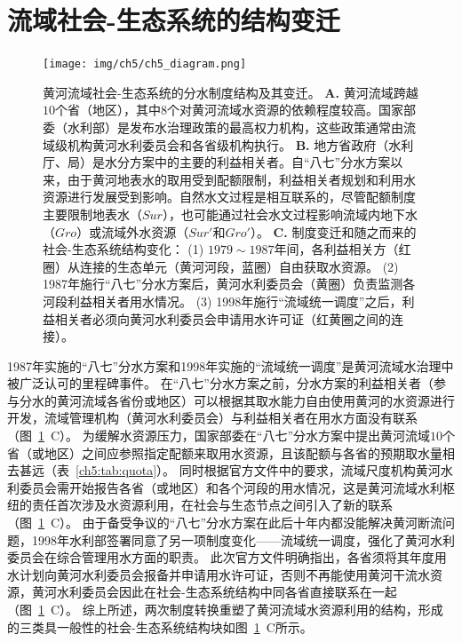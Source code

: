 
\section{流域社会-生态系统的结构变迁}\label{results-1}

\begin{figure}[!t]
	\texttt{[image: img/ch5/ch5\_diagram.png]}
	\caption[黄河流域社会-生态系统的分水制度结构及其变迁]{
		黄河流域社会-生态系统的分水制度结构及其变迁。
		\textbf{A.} 黄河流域跨越$10$个省（地区），其中$8$个对黄河流域水资源的依赖程度较高。国家部委（水利部）是发布水治理政策的最高权力机构，这些政策通常由流域级机构黄河水利委员会和各省级机构执行。
		\textbf{B.} 地方省政府（水利厅、局）是水分方案中的主要的利益相关者。自“八七”分水方案以来，由于黄河地表水的取用受到配额限制，利益相关者规划和利用水资源进行发展受到影响。自然水文过程是相互联系的，尽管配额制度主要限制地表水（$Sur$），也可能通过社会水文过程影响流域内地下水（$Gro$）或流域外水资源（$Sur'$和$Gro'$）。
		\textbf{C.} 制度变迁和随之而来的社会-生态系统结构变化：
		(1) $1979 \sim 1987$年间，各利益相关方（红圈）从连接的生态单元（黄河河段，蓝圈）自由获取水资源。
		(2) 1987年施行“八七”分水方案后，黄河水利委员会（黄圈）负责监测各河段利益相关者用水情况。
		(3) 1998年施行“流域统一调度”之后，利益相关者必须向黄河水利委员会申请用水许可证（红黄圈之间的连接）。}\label{fig:structure}
\end{figure}

1987年实施的“八七”分水方案和1998年实施的“流域统一调度”是黄河流域水治理中被广泛认可的里程碑事件。
在“八七”分水方案之前，分水方案的利益相关者（参与分水的黄河流域各省份或地区）可以根据其取水能力自由使用黄河的水资源进行开发，流域管理机构（黄河水利委员会）与利益相关者在用水方面没有联系（图~\ref{fig:structure}~C）。
为缓解水资源压力，国家部委在“八七”分水方案中提出黄河流域$10$个省（或地区）之间应参照指定配额来取用水资源，且该配额与各省的预期取水量相去甚远（表~\ref{ch5:tab:quota}）。
同时根据官方文件中的要求，流域尺度机构黄河水利委员会需开始报告各省（或地区）和各个河段的用水情况，这是黄河流域水利枢纽的责任首次涉及水资源利用，在社会与生态节点之间引入了新的联系（图~\ref{fig:structure}~C）。
由于备受争议的“八七”分水方案在此后十年内都没能解决黄河断流问题，1998年水利部签署同意了另一项制度变化——流域统一调度，强化了黄河水利委员会在综合管理用水方面的职责。
此次官方文件明确指出，各省须将其年度用水计划向黄河水利委员会报备并申请用水许可证，否则不再能使用黄河干流水资源，黄河水利委员会因此在社会-生态系统结构中同各省直接联系在一起（图~\ref{fig:structure}~C）。
综上所述，两次制度转换重塑了黄河流域水资源利用的结构，形成的三类具一般性的社会-生态系统结构块如图~\ref{fig:structure}~C所示。

